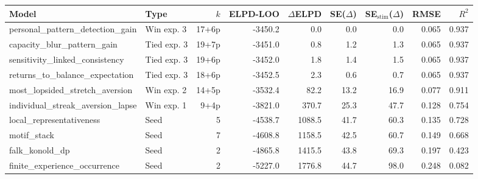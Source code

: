 \begin{tabular}{llrrrrrrr}
  \toprule
  Model & Type & $k$ & ELPD-LOO & $\Delta$ELPD & SE($\Delta$) & SE$_\mathrm{stim}$($\Delta$) & RMSE & $R^2$ \\
  \midrule
  personal\_pattern\_detection\_gain & Win exp. 3 & 17+6p & -3450.2 & 0.0 & 0.0 & 0.0 & 0.065 & 0.937 \\
  capacity\_blur\_pattern\_gain & Tied exp. 3 & 19+7p & -3451.0 & 0.8 & 1.2 & 1.3 & 0.065 & 0.937 \\
  sensitivity\_linked\_consistency & Tied exp. 3 & 19+6p & -3452.0 & 1.8 & 1.4 & 1.5 & 0.065 & 0.937 \\
  returns\_to\_balance\_expectation & Tied exp. 3 & 18+6p & -3452.5 & 2.3 & 0.6 & 0.7 & 0.065 & 0.937 \\
  most\_lopsided\_stretch\_aversion & Win exp. 2 & 14+5p & -3532.4 & 82.2 & 13.2 & 16.9 & 0.077 & 0.911 \\
  individual\_streak\_aversion\_lapse & Win exp. 1 & 9+4p & -3821.0 & 370.7 & 25.3 & 47.7 & 0.128 & 0.754 \\
  local\_representativeness & Seed & 5 & -4538.7 & 1088.5 & 41.7 & 60.3 & 0.135 & 0.728 \\
  motif\_stack & Seed & 7 & -4608.8 & 1158.5 & 42.5 & 60.7 & 0.149 & 0.668 \\
  falk\_konold\_dp & Seed & 2 & -4865.8 & 1415.5 & 43.8 & 69.3 & 0.197 & 0.423 \\
  finite\_experience\_occurrence & Seed & 2 & -5227.0 & 1776.8 & 44.7 & 98.0 & 0.248 & 0.082 \\
  \bottomrule
\end{tabular}
